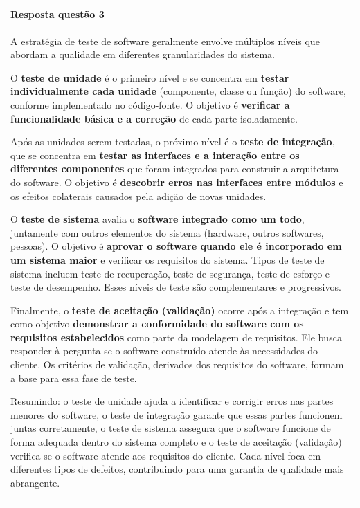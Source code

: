 \documentclass[
]{book}
\begin{document}
\begin{longtable}[]{@{}
  >{\raggedright\arraybackslash}p{}@{}}
\toprule\noalign{}
\endhead
\bottomrule\noalign{}
\endlastfoot
\textbf{Resposta questão 3} \\
A estratégia de teste de software geralmente envolve múltiplos níveis que abordam a qualidade em diferentes granularidades do sistema.

O \textbf{teste de unidade} é o primeiro nível e se concentra em \textbf{testar individualmente cada unidade} (componente, classe ou função) do software, conforme implementado no código-fonte. O objetivo é \textbf{verificar a funcionalidade básica e a correção} de cada parte isoladamente.

Após as unidades serem testadas, o próximo nível é o \textbf{teste de integração}, que se concentra em \textbf{testar as interfaces e a interação entre os diferentes componentes} que foram integrados para construir a arquitetura do software. O objetivo é \textbf{descobrir erros nas interfaces entre módulos} e os efeitos colaterais causados pela adição de novas unidades.

O \textbf{teste de sistema} avalia o \textbf{software integrado como um todo}, juntamente com outros elementos do sistema (hardware, outros softwares, pessoas). O objetivo é \textbf{aprovar o software quando ele é incorporado em um sistema maior} e verificar os requisitos do sistema. Tipos de teste de sistema incluem teste de recuperação, teste de segurança, teste de esforço e teste de desempenho. Esses níveis de teste são complementares e progressivos.

Finalmente, o \textbf{teste de aceitação (validação)} ocorre após a integração e tem como objetivo \textbf{demonstrar a conformidade do software com os requisitos estabelecidos} como parte da modelagem de requisitos. Ele busca responder à pergunta se o software construído atende às necessidades do cliente. Os critérios de validação, derivados dos requisitos do software, formam a base para essa fase de teste.

Resumindo: o teste de unidade ajuda a identificar e corrigir erros nas partes menores do software, o teste de integração garante que essas partes funcionem juntas corretamente, o teste de sistema assegura que o software funcione de forma adequada dentro do sistema completo e o teste de aceitação (validação) verifica se o software atende aos requisitos do cliente. Cada nível foca em diferentes tipos de defeitos, contribuindo para uma garantia de qualidade mais abrangente. \\
\end{longtable}
\end{document}
